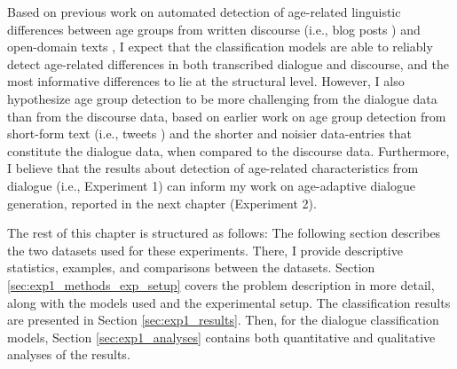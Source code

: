Based on previous work on automated detection of age-related linguistic differences between age groups from written discourse (i.e., blog posts \citep{schler2006effects}) and open-domain texts \citep{abdallah2020age}, I expect that the classification models are able to reliably detect age-related differences in both transcribed dialogue and discourse, and the most informative differences to lie at the structural level. However, I also hypothesize age group detection to be more challenging from the dialogue data than from the discourse data, based on earlier work on age group detection from short-form text (i.e., tweets \citep{nguyen2014gender}) and the shorter and noisier data-entries that constitute the dialogue data, when compared to the discourse data. Furthermore, I believe that the results about detection of age-related characteristics from dialogue (i.e., Experiment 1) can inform my work on age-adaptive dialogue generation, reported in the next chapter (Experiment 2).


The rest of this chapter is structured as follows: The following section describes the two datasets used for these experiments. There, I provide descriptive statistics, examples, and comparisons between the datasets. Section \ref{sec:exp1_methods_exp_setup} covers the problem description in more detail, along with the models used and the experimental setup. The classification results are presented in Section \ref{sec:exp1_results}. Then, for the dialogue classification models, Section \ref{sec:exp1_analyses} contains both quantitative and qualitative analyses of the results.

